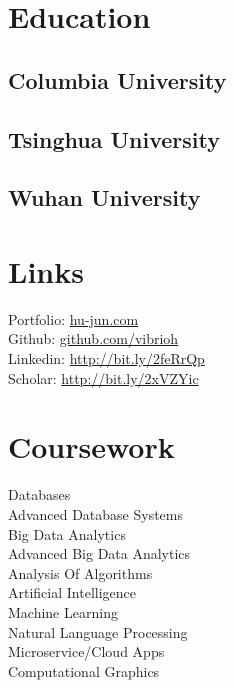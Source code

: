 \documentclass[]{junhu_resume}
\begin{document}
\begin{minipage}[t]{0.28\textwidth} 


\section{Education} 

\subsection{Columbia University}
\sectionsep

\subsection{Tsinghua University}
\sectionsep

\subsection{Wuhan University}
\sectionsep


\section{Links} 
Portfolio: \href{http://www.hu-jun.com}{hu-jun.com}\\
Github: \href{https://github.com/vibrioh}{github.com/vibrioh}\\
Linkedin: \href{https://www.linkedin.com/in/jun-hu-664639a2/}{http://bit.ly/2feRrQp} \\
Scholar: \href{https://scholar.google.com/citations?user=Vr8dYJsAAAAJ}{http://bit.ly/2xVZYic}
\sectionsep


\section{Coursework}
Databases\\
Advanced Database Systems\\
Big Data Analytics\\
Advanced Big Data Analytics\\
Analysis Of Algorithms\\
Artificial Intelligence\\
Machine Learning\\
Natural Language Processing\\
Microservice/Cloud Apps\\
Computational Graphics
\sectionsep


\end{minipage}
\end{document}
